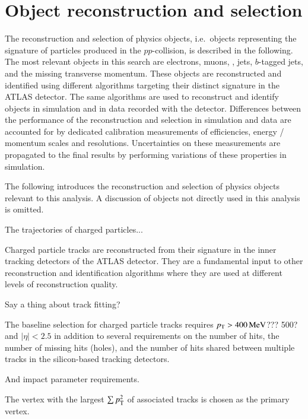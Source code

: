 \section{Object reconstruction and selection}
\label{sec:object_reconstruction}

The reconstruction and selection of physics objects, i.e.\ objects
representing the signature of particles produced in the
$pp$-collision, is described in the following. The most relevant
objects in this search are electrons, muons, \tauhadvis, jets,
$b$-tagged jets, and the missing transverse momentum. These objects
are reconstructed and identified using different algorithms targeting
their distinct signature in the ATLAS detector. The same algorithms
are used to reconstruct and identify objects in simulation and in data
recorded with the detector.  Differences between the performance of
the reconstruction and selection in simulation and data are accounted
for by dedicated calibration measurements of efficiencies, energy /
momentum scales and resolutions. Uncertainties on these measurements
are propagated to the final results by performing variations of these
properties in simulation.

The following introduces the reconstruction and selection of physics
objects relevant to this analysis. A discussion of objects not
directly used in this analysis is omitted.



The trajectories of charged particles...

Charged particle tracks are reconstructed from their signature in the
inner tracking detectors of the ATLAS detector. They are a fundamental
input to other reconstruction and identification algorithms where they
are used at different levels of reconstruction quality.

Say a thing about track fitting?

The baseline selection for charged particle tracks requires
$\pT > \SI{400}{\MeV}$??? 500?  and $|\eta| < \num{2.5}$ in addition
to several requirements on the number of hits, the number of missing
hits (holes), and the number of hits shared between multiple tracks in
the silicon-based tracking detectors.

And impact parameter requirements.

The vertex with the largest $\sum p_{\text{T}}^2$ of associated tracks is
chosen as the primary vertex.

